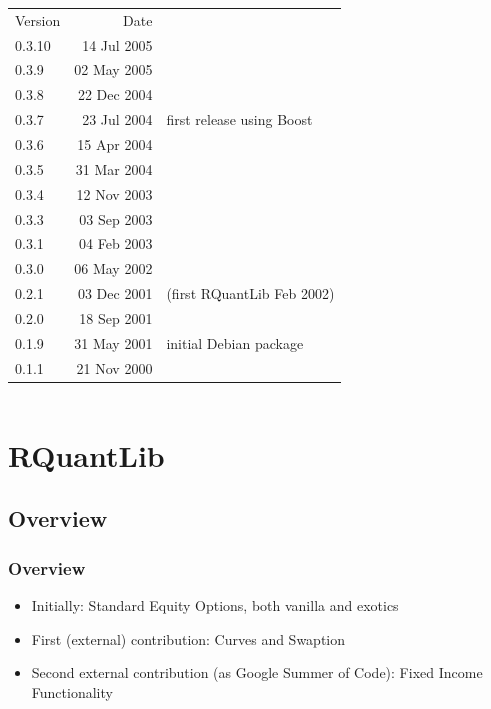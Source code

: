 \documentclass[compress]{beamer}
\begin{document}
\begin{frame}
\begin{columns}
    \begin{column}{2.75in}
      \scriptsize
      \begin{tabular}{lrl}
        Version & Date &\\ 
        0.3.10& 14 Jul 2005 & \\
        0.3.9 & 02 May 2005 & \\
        0.3.8 & 22 Dec 2004 & \\
        0.3.7 & 23 Jul 2004 & first release using Boost \\
        0.3.6 & 15 Apr 2004 & \\
        0.3.5 & 31 Mar 2004 & \\
        0.3.4 & 12 Nov 2003 & \\
        0.3.3 & 03 Sep 2003 & \\
        0.3.1 & 04 Feb 2003 & \\
        0.3.0 & 06 May 2002 & \\
        0.2.1 & 03 Dec 2001 & (first RQuantLib Feb 2002) \\
        0.2.0 & 18 Sep 2001 & \\
        0.1.9 & 31 May 2001 & initial Debian package \\
        0.1.1 & 21 Nov 2000 & \\
      \end{tabular}
    \end{column}
  \end{columns}
\end{frame}

\section{RQuantLib}
\subsection{Overview}
\begin{frame}
  \frametitle{Overview}
  \begin{itemize}
  \item Initially: Standard Equity Options, both vanilla and exotics
  \item First (external) contribution: Curves and Swaption
  \item Second external contribution (as Google Summer of Code): Fixed Income
    Functionality
  \end{itemize}
\end{frame}
\end{document}
